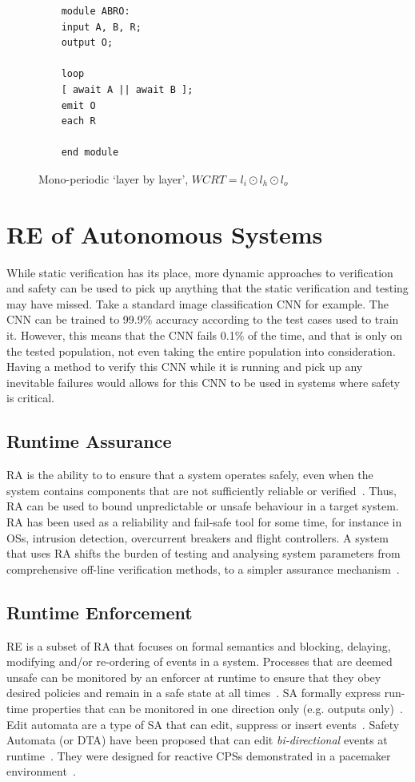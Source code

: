 \begin{figure}
	\begin{lstlisting}
	module ABRO:
	input A, B, R;
	output O;
	
	loop
	[ await A || await B ];
	emit O
	each R
	
	end module
	\end{lstlisting}
	\caption{Mono-periodic `layer by layer', $WCRT = l_i \odot l_h \odot l_o$}
	\label{fig:esterel-abro}
\end{figure}


\section{\acf{RE} of Autonomous Systems}
While static verification has its place, more dynamic approaches to verification and safety can be used to pick up anything that the static verification and testing may have missed.
Take a standard image classification \ac{CNN} for example.
The \ac{CNN} can be trained to 99.9\% accuracy according to the test cases used to train it.
However, this means that the \ac{CNN} fails 0.1\% of the time, and that is only on the tested population, not even taking the entire population into consideration.
Having a method to verify this \ac{CNN} while it is running and pick up any inevitable failures would allows for this \ac{CNN} to be used in systems where safety is critical.

\subsection{Runtime Assurance}
\ac{RA} is the ability to to ensure that a system operates safely, even when the system contains components that are not sufficiently reliable or verified~\cite{rta-cps}. 
Thus, \ac{RA} can be used to bound unpredictable or unsafe behaviour in a target system. 
\ac{RA} has been used as a reliability and fail-safe tool for some time, for instance in \acp{OS}, intrusion detection, overcurrent breakers and flight controllers. 
A system that uses \ac{RA} shifts the burden of testing and analysing system parameters from comprehensive off-line verification methods, to a simpler assurance mechanism~\cite{rta-cps}. 

\subsection{Runtime Enforcement}
\ac{RE} is a subset of \ac{RA} that focuses on formal semantics and blocking, delaying, modifying and/or re-ordering of events in a system. 
Processes that are deemed unsafe can be monitored by an enforcer at runtime to ensure that they obey desired policies and remain in a safe state at all times~\cite{theoryRE}. 
\ac{SA} formally express run-time properties that can be monitored in one direction only (e.g. outputs only)~\cite{enfsafepol}. 
Edit automata are a type of \ac{SA} that can edit, suppress or insert events~\cite{editautomata}. 
Safety Automata (or \ac{DTA}) have been proposed that can edit \textit{bi-directional} events at runtime~\cite{recps}. 
They were designed for reactive \acp{CPS} demonstrated in a pacemaker environment~\cite{recps}. 

